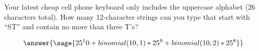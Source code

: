 \documentclass{ximera}
\begin{document}
\begin{problem} 
Your latest cheap cell phone keyboard only includes the uppercase
alphabet (26 characters total).  How many 12-character strings can you
type that start with ``ST'' and contain no more than three T's?
\begin{explanation}
$$\answer{\sage{25^10+binomial(10,1)*25^9+binomial(10,2)*25^8}}$$
\end{explanation}

\end{problem}
\end{document}
